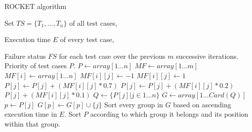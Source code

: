 \begin{algorithm}[h!]
\caption{ROCKET algorithm}
\label{alg:rocket}
\begin{algorithmic}[1]
	 Set $TS = \{T_1, \dots, T_n\}$ of all test cases,

	Execution time $E$ of every test case,
	
	Failure status $FS$ for each test case over the previous $m$ successive iterations.
	 Priority of test cases $P$.
	\State $P \gets array[1 \dots n]$ 
	\State $MF \gets array[1 \dots m]$
		\State $MF[i] \gets array[1 \dots n]$
			 $MF[i][j] \gets -1$
			\Else{} $MF[i][j] \gets 1$
			\EndIf
		\EndFor
	\EndFor
			 $P[j] \gets P[j] + (MF[i][j] * 0.7)$
			 $P[j] \gets P[j] + (MF[i][j] * 0.2)$
			\Else{} $P[j] + (MF[i][j] * 0.1)$
			\EndIf
		\EndFor
	\EndFor
	\State $Q \gets \{P[j] \vert j \in 1 \dots n\}$ 
	\State $G \gets array[1 \dots Card(Q)]$ 
		\State $p \gets P[j]$
		\State $G[p] \gets G[p] \cup \{j\}$
	\EndFor
	\State Sort every group in $G$ based on ascending execution time in $E$.
	\State Sort $P$ according to which group it belongs and its position within that group.
\end{algorithmic}
\end{algorithm}
